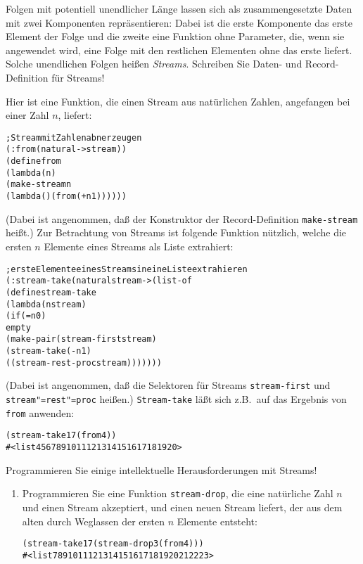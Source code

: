 \begin{aufgabe}
  Folgen mit potentiell unendlicher Länge lassen sich als
  zusammengesetzte Daten mit zwei Komponenten repräsentieren: Dabei
  ist die erste Komponente das erste Element der Folge und die zweite
  eine Funktion ohne Parameter, die, wenn sie angewendet wird, eine Folge mit
  den restlichen Elementen ohne das erste liefert.
  Solche unendlichen Folgen heißen \textit{Streams}.
  Schreiben Sie Daten- und Record-Definition für Streams!

  Hier ist eine Funktion, die einen Stream aus natürlichen Zahlen,
  angefangen bei einer Zahl $n$, liefert:
  \begin{alltt}
; Stream mit Zahlen ab n erzeugen
(: from (natural -> stream))
(define from
  (lambda (n)
    (make-stream n
                 (lambda () (from (+ n 1))))))
  \end{alltt}
  (Dabei ist angenommen, daß der Konstruktor der Record-Definition
  \texttt{make-stream} heißt.)
  Zur Betrachtung von Streams ist folgende Funktion nützlich, welche
  die ersten $n$ Elemente eines Streams als Liste extrahiert:
  \begin{alltt}
; erste Elemente eines Streams in eine Liste extrahieren
(: stream-take (natural stream -> (list-of %a)))
(define stream-take
  (lambda (n stream)
    (if (= n 0)
        empty
        (make-pair (stream-first stream)
                   (stream-take (- n 1)
                                ((stream-rest-proc stream)))))))
   \end{alltt}
   (Dabei ist angenommen, daß die Selektoren für Streams
   \texttt{stream-first} und \texttt{stream"=rest"=proc} heißen.)
   \texttt{Stream-take} läßt sich z.B.\ auf das Ergebnis von
   \texttt{from} anwenden:
   \begin{alltt}
(stream-take 17 (from 4))
\evalsto{} #<list 4 5 6 7 8 9 10 11 12 13 14 15 16 17 18 19 20>
   \end{alltt}
   Programmieren Sie einige intellektuelle Herausforderungen mit Streams!
   \begin{enumerate}
   \item Programmieren Sie eine Funktion \texttt{stream-drop}, die eine
     natürliche Zahl $n$ und einen Stream akzeptiert, und einen neuen
     Stream liefert, der aus dem alten durch Weglassen der ersten $n$
     Elemente entsteht:
     \begin{alltt}
(stream-take 17 (stream-drop 3 (from 4)))
\evalsto{} #<list 7 8 9 10 11 12 13 14 15 16 17 18 19 20 21 22 23>
     \end{alltt}

\end{enumerate}
\end{aufgabe}
